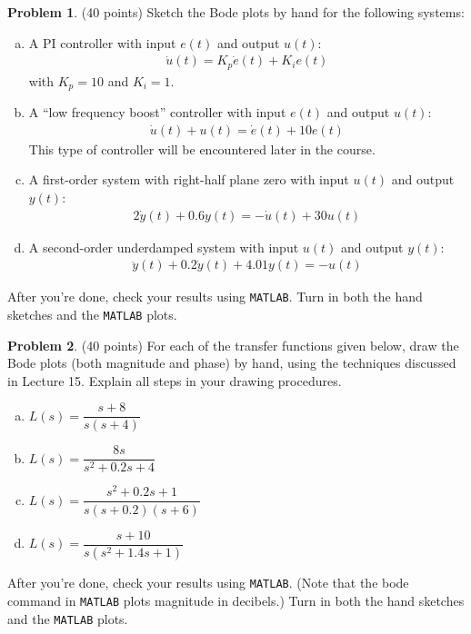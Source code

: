 \documentclass{article}
\theoremstyle{definition}
\newtheorem{problem}{Problem}
\begin{document}
\begin{problem} (40 points)
Sketch the Bode plots by hand for the following 
  systems:
  \begin{enumerate}[(a)]
    \item A PI controller with input $e(t)$ and output $u(t)$:
      \begin{align*}
         \dot{u}(t) = K_p \dot{e}(t) + K_i e(t)
      \end{align*}
      with $K_p = 10$ and $K_i = 1$.

    \item A ``low frequency boost'' controller with input 
      $e(t)$ and output $u(t)$:
      \begin{align*}
         \dot{u}(t) + u(t) = \dot{e}(t) + 10 e(t)
      \end{align*}
      This type of controller will be encountered later in
      the course.

    \item A first-order system with right-half plane zero with input
      $u(t)$ and output $y(t)$:
      \begin{align*}
        2 \dot{y}(t) + 0.6 y(t) = -\dot{u}(t) + 30 u(t)
      \end{align*}

    \item A second-order underdamped system with input $u(t)$
      and output $y(t)$:
      \begin{align*}
        \ddot{y}(t) + 0.2\dot{y}(t) +4.01 y(t) = -u(t)
      \end{align*}

  \end{enumerate}
After you're done, check your results using \texttt{MATLAB}. Turn in both the hand sketches and the
\texttt{MATLAB} plots.
\end{problem}


\begin{problem}(40 points)
For each of the transfer functions given below, draw the Bode plots (both magnitude
and phase) by hand, using the techniques discussed in Lecture 15. Explain all steps in your
drawing procedures.
\begin{multicols}{2}
\begin{enumerate}[(a)]
\item
$L(s) = \dfrac{s+8}{s(s+4)}$

\item
$L(s) = \dfrac{8s}{s^2+0.2s+4}$

\item
$L(s) = \dfrac{s^2+0.2s+1}{s(s+0.2)(s+6)}$

\item
$L(s) = \dfrac{s+10}{s(s^2+1.4s+1)}$
\end{enumerate}
\end{multicols}
After you're done, check your results using \texttt{MATLAB}. (Note that the bode command
in \texttt{MATLAB} plots magnitude in decibels.) Turn in both the hand sketches and the
\texttt{MATLAB} plots.
\end{problem}
\end{document}
